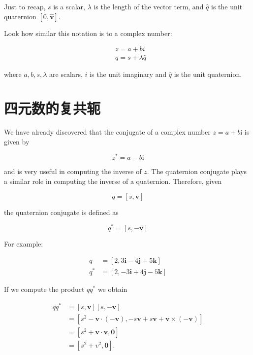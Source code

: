 Just to recap, $s$ is a scalar, $\lambda$ is the length of the vector term, and $\hat{q}$ is the unit quaternion $[0, \hat{\mathbf{v}}]$.

Look how similar this notation is to a complex number:

$$
    \begin{aligned}
         & z=a+b i             \\
         & q=s+\lambda \hat{q}
    \end{aligned}
$$

where $a, b, s, \lambda$ are scalars, $i$ is the unit imaginary and $\hat{q}$ is the unit quaternion.

\section{四元数的复共轭}
We have already discovered that the conjugate of a complex number $z=a+b \mathrm{i}$ is given by

$$
    z^{*}=a-b \mathrm{i}
$$

and is very useful in computing the inverse of $z$. The quaternion conjugate plays a similar role in computing the inverse of a quaternion. Therefore, given

$$
    q=[s, \mathbf{v}]
$$

the quaternion conjugate is defined as

$$
    q^{*}=[s,-\mathbf{v}]
$$

For example:

$$
    \begin{aligned}
        q     & =[2,3 \mathbf{i}-4 \mathbf{j}+5 \mathbf{k}]  \\
        q^{*} & =[2,-3 \mathbf{i}+4 \mathbf{j}-5 \mathbf{k}]
    \end{aligned}
$$

If we compute the product $q q^{*}$ we obtain

$$
    \begin{aligned}
        q q^{*} & =[s, \mathbf{v}][s,-\mathbf{v}]                                                                             \\
                & =\left[s^{2}-\mathbf{v} \cdot(-\mathbf{v}),-s \mathbf{v}+s \mathbf{v}+\mathbf{v} \times(-\mathbf{v})\right] \\
                & =\left[s^{2}+\mathbf{v} \cdot \mathbf{v}, \mathbf{0}\right]                                                 \\
                & =\left[s^{2}+v^{2}, \mathbf{0}\right] .
    \end{aligned}
$$

